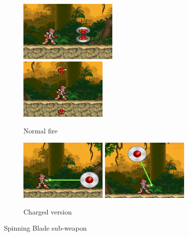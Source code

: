\begin{figure}[htp]
	\centering
	\begin{subfigure}{\linewidth}
		\centering
		\includegraphics[height=3cm]{figures/X3/weapons/S_blade.png}
		\includegraphics[height=3cm]{figures/X3/weapons/S_blade_1.png}
		\caption{Normal fire }	
	\end{subfigure}
	\begin{subfigure}{\linewidth}
		\centering
		\includegraphics[height=3cm]{figures/X3/weapons/S_blade_C.png}
		\includegraphics[height=3cm]{figures/X3/weapons/S_blade_C1.png}
		\caption{Charged version}	
	\end{subfigure}
	\caption{Spinning Blade sub-weapon}
\end{figure}

